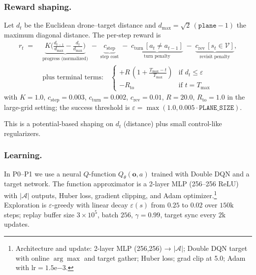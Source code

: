         \subsubsection{Reward shaping.}
            Let $d_t$ be the Euclidean drone–target distance and $d_{\max}=\sqrt{2}\,(\texttt{plane}-1)$ the maximum diagonal distance. The per-step reward is
            \begin{align}
                r_t \;=\; &\underbrace{K \big(\tfrac{d_{t-1}}{d_{\max}}-\tfrac{d_t}{d_{\max}}\big)}_{\text{progress (normalized)}} \;-\; \underbrace{c_{\mathrm{step}}}_{\text{step cost}}
                \;-\; \underbrace{c_{\mathrm{turn}}\,[a_t\neq a_{t-1}]}_{\text{turn penalty}}
                \;-\; \underbrace{c_{\mathrm{rev}}\,[s_t\in\mathcal{V}]}_{\text{revisit penalty}}, \label{eq:reward}\\
                &\text{plus terminal terms:}\quad
                \begin{cases}
                +R\,(1+\tfrac{T_{\max}-t}{T_{\max}}) & \text{if } d_t\le \varepsilon \\
                - R_{\mathrm{to}} & \text{if } t\!=\!T_{\max}
                \end{cases}\nonumber
            \end{align}
            with $K=1.0$, $c_{\mathrm{step}}{=}0.003$, $c_{\mathrm{turn}}{=}0.002$, $c_{\mathrm{rev}}{=}0.01$, $R{=}20.0$, $R_{\mathrm{to}}{=}1.0$ in the large-grid setting; the success threshold is $\varepsilon=\max(1.0,0.005\cdot \texttt{PLANE\_SIZE})$.%

            This is a potential-based shaping on $d_t$ (distance) plus small control-like regularizers.

        \subsubsection{Learning.}
            In P0--P1 we use a neural $Q$-function $Q_\theta(\mathbf{o},a)$ trained with Double DQN and a target network. The function approximator is a 2-layer MLP (256–256 ReLU) with $|\mathcal{A}|$ outputs, Huber loss, gradient clipping, and Adam optimizer.\footnote{Architecture and update: 2-layer MLP (256,256) → $|\mathcal{A}|$; Double DQN target with online $\arg\max$ and target gather; Huber loss; grad clip at 5.0; Adam with $\mathrm{lr}=1.5\mathrm{e}{-3}$.}
            Exploration is $\varepsilon$-greedy with linear decay $\varepsilon(s)$ from $0.25$ to $0.02$ over $150\text{k}$ steps; replay buffer size $3\!\times\!10^5$, batch $256$, $\gamma=0.99$, target sync every $2\text{k}$ updates.

